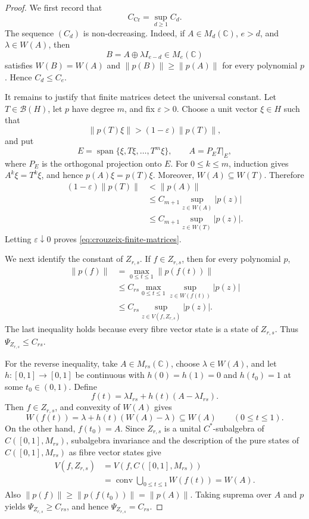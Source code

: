 \documentclass[10pt,a4paper]{amsart}
\DeclareMathOperator{\conv}{conv}
\newcommand{\C}{\mathbb C}
\newcommand{\calB}{\mathcal B}
\begin{document}
\begin{proof}
We first record that
\begin{equation}\label{eq:crouzeix-finite-matrices}
       C_{\mathrm{Cr}}=\sup_{d\geqslant1}C_d.
\end{equation}
The sequence \((C_d)\) is non-decreasing.  Indeed, if \(A\in M_d(\C)\),
\(e>d\), and \(\lambda\in W(A)\), then
\[
       B=A\oplus\lambda I_{e-d}\in M_e(\C)
\]
satisfies \(W(B)=W(A)\) and \(\|p(B)\|\geqslant\|p(A)\|\) for every
polynomial \(p\).  Hence \(C_d\leqslant C_e\).

It remains to justify that finite matrices detect the universal constant.  Let
\(T\in\calB(H)\), let \(p\) have degree \(m\), and fix \(\varepsilon>0\).
Choose a unit vector \(\xi\in H\) such that
\[
       \|p(T)\xi\|>(1-\varepsilon)\|p(T)\|,
\]
and put
\[
       E=\operatorname{span}\{\xi,T\xi,\ldots,T^m\xi\},
       \qquad A=P_ET|_E,
\]
where \(P_E\) is the orthogonal projection onto \(E\).  For
\(0\leqslant k\leqslant m\), induction gives \(A^k\xi=T^k\xi\), and hence
\(p(A)\xi=p(T)\xi\).  Moreover, \(W(A)\subseteq W(T)\).  Therefore
\[
\begin{split}
       (1-\varepsilon)\|p(T)\|
       &<\|p(A)\|\\
       &\leqslant C_{m+1}\sup_{z\in W(A)}|p(z)|\\
       &\leqslant C_{m+1}\sup_{z\in W(T)}|p(z)|.
\end{split}
\]
Letting \(\varepsilon\downarrow0\) proves \eqref{eq:crouzeix-finite-matrices}.

We next identify the constant of \(Z_{r,s}\).  If \(f\in Z_{r,s}\), then for
every polynomial \(p\),
\[
\begin{split}
       \|p(f)\|
       &=\max_{0\leqslant t\leqslant1}\|p(f(t))\|\\
       &\leqslant C_{rs}
          \max_{0\leqslant t\leqslant1}
          \sup_{z\in W(f(t))}|p(z)|\\
       &\leqslant C_{rs}\sup_{z\in V(f,Z_{r,s})}|p(z)|.
\end{split}
\]
The last inequality holds because every fibre vector state is a state of
\(Z_{r,s}\).  Thus \(\Psi_{Z_{r,s}}\leqslant C_{rs}\).

For the reverse inequality, take \(A\in M_{rs}(\C)\), choose
\(\lambda\in W(A)\), and let \(h:[0,1]\to[0,1]\) be continuous with
\(h(0)=h(1)=0\) and \(h(t_0)=1\) at some \(t_0\in(0,1)\).  Define
\[
       f(t)=\lambda I_{rs}+h(t)(A-\lambda I_{rs}).
\]
Then \(f\in Z_{r,s}\), and convexity of \(W(A)\) gives
\[
       W(f(t))=\lambda+h(t)(W(A)-\lambda)\subseteq W(A)
       \qquad(0\leqslant t\leqslant1).
\]
On the other hand, \(f(t_0)=A\).  Since \(Z_{r,s}\) is a unital
\(C^*\)-subalgebra of \(C([0,1],M_{rs})\), subalgebra invariance and the
description of the pure states of \(C([0,1],M_{rs})\) as fibre vector states
give
\[
\begin{split}
       V(f,Z_{r,s})
       &=V(f,C([0,1],M_{rs}))\\
       &=\conv\bigcup_{0\leqslant t\leqslant1}W(f(t))
        =W(A).
\end{split}
\]
Also \(\|p(f)\|\geqslant\|p(f(t_0))\|=\|p(A)\|\).  Taking suprema over
\(A\) and \(p\) yields \(\Psi_{Z_{r,s}}\geqslant C_{rs}\), and hence
\(\Psi_{Z_{r,s}}=C_{rs}\).


\end{proof}
\end{document}
